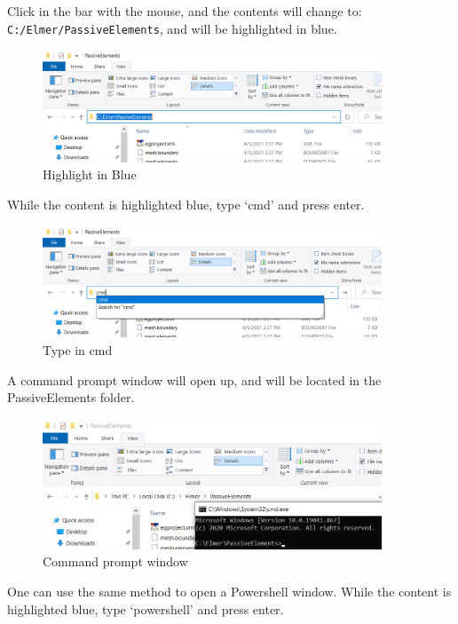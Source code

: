 Click in the bar with the mouse, and the contents will change to: \texttt{C:/Elmer/PassiveElements}, and will be highlighted in blue.  

\begin{figure}[H]
\centering
\includegraphics[width=0.9\textwidth]{cmd-2}
\caption{Highlight in Blue}\label{fg:cmd-2}
\end{figure}

While the content is highlighted blue, type `cmd' and press enter.

\begin{figure}[H]
\centering
\includegraphics[width=0.9\textwidth]{cmd-3}
\caption{Type in cmd}\label{fg:cmd-3}
\end{figure}

A command prompt window will open up, and will be located in the PassiveElements folder.\\

\begin{figure}[H]
\centering
\includegraphics[width=0.9\textwidth]{cmd-4}
\caption{Command prompt window}\label{fg:cmd-4}
\end{figure}

\newpage

One can use the same method to open a Powershell window.  While the content is highlighted blue, type `powershell' and press enter.


